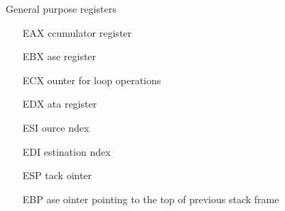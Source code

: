 \begin{frame}
  \begin{block}{General purpose registers}
    \begin{multicols}{2}
      \begin{itemize}
      \item[EAX] ccumulator register
      \item[EBX] ase register
      \item[ECX] ounter for loop operations
      \item[EDX] ata register
        \columnbreak
      \item[ESI] ource ndex
      \item[EDI] estination ndex
      \item[ESP] tack ointer
      \item[EBP] ase ointer pointing to the top of previous stack frame
      \end{itemize}
    \end{multicols}
  \end{block}
\end{frame}


